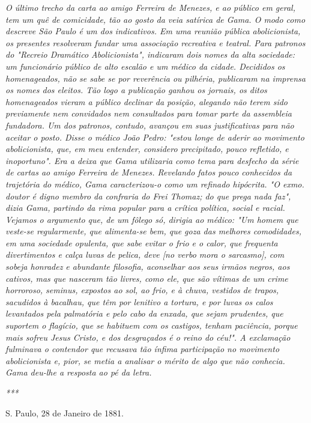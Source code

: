 \emph{O último trecho da carta ao amigo Ferreira de Menezes, e ao
público em geral, tem um quê de comicidade, tão ao gosto da veia
satírica de Gama. O modo como descreve São Paulo é um dos indicativos.
Em uma reunião pública abolicionista, os presentes resolveram fundar uma
associação recreativa e teatral. Para patronos do "Recreio Dramático
Abolicionista", indicaram dois nomes da alta sociedade: um funcionário
público de alto escalão e um médico da cidade. Decididos os
homenageados, não se sabe se por reverência ou pilhéria, publicaram na
imprensa os nomes dos eleitos. Tão logo a publicação ganhou os jornais,
os ditos homenageados vieram a público declinar da posição, alegando não
terem sido previamente nem convidados nem consultados para tomar parte
da assembleia fundadora. Um dos patronos, contudo, avançou em suas
justificativas para não aceitar o posto. Disse o médico João Pedro:
"estou longe de aderir ao movimento abolicionista, que, em meu entender,
considero precipitado, pouco refletido, e inoportuno". Era a deixa que
Gama utilizaria como tema para desfecho da série de cartas ao amigo
Ferreira de Menezes. Revelando fatos pouco conhecidos da trajetória do
médico, Gama caracterizou-o como um refinado hipócrita. "O exmo. doutor
é digno membro da confraria do Frei Thomaz; do que prega nada faz",
dizia Gama, partindo da rima popular para a crítica política, social e
racial. Vejamos o argumento que, de um fôlego só, dirigia ao médico: "Um
homem que veste-se regularmente, que alimenta-se bem, que goza das
melhores comodidades, em uma sociedade opulenta, que sabe evitar o frio
e o calor, que frequenta divertimentos e calça luvas de pelica, deve
{[}no verbo mora o sarcasmo{]}, com sobeja honradez e abundante
filosofia, aconselhar aos seus irmãos negros, aos cativos, mas que
nasceram tão livres, como ele, que são vítimas de um crime horroroso,
seminus, expostos ao sol, ao frio, e à chuva, vestidos de trapos,
sacudidos à bacalhau, que têm por lenitivo a tortura, e por luvas os
calos levantados pela palmatória e pelo cabo da enxada, que sejam
prudentes, que suportem o flagício, que se habituem com os castigos,
tenham paciência, porque mais sofreu Jesus Cristo, e dos desgraçados é o
reino do céu!". A exclamação fulminava o contendor que recusava tão
ínfima participação no movimento abolicionista e, pior, se metia a
analisar o mérito de algo que não conhecia. Gama deu-lhe a resposta ao
pé da letra.}

\emph{***}

S. Paulo, 28 de Janeiro de 1881.

